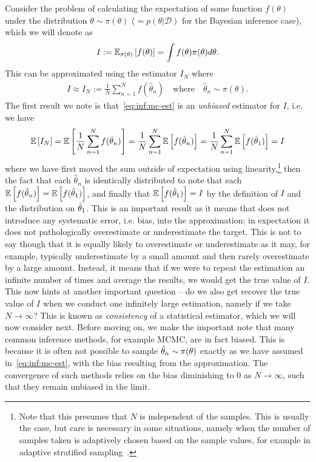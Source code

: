 Consider the problem of calculating the expectation of some function
$f(\theta)$ under the distribution $\theta\sim \pi(\theta)$ ($= p(\theta | \mathcal{D})$ for the Bayesian
inference case), which we will denote 
as
\begin{align}
	\label{eq:inf:expt}
I:=\mathbb{E}_{\pi(\theta)} \left[f(\theta)\right]=\int f(\theta) \pi(\theta) d\theta.
\end{align}
This can be approximated using the \mc estimator $I_N$ where
\begin{align}
	\label{eq:inf:mc-est}
	I \approx I_N := \frac{1}{N} \sum_{n=1}^{N}f(\hat{\theta}_n)
	\quad \text{where} \quad \hat{\theta}_n \sim \pi(\theta).
\end{align}
The first result we note is that~\eqref{eq:inf:mc-est} is an \emph{unbiased} estimator for $I$, i.e. we have
\begin{align}
\label{eq:inf:unbiased}
\mathbb{E} \left[I_N\right] = \mathbb{E} \left[\frac{1}{N} \sum_{n=1}^{N}f(\hat{\theta}_n)\right]
= \frac{1}{N} \sum_{n=1}^{N} \mathbb{E} \left[f(\hat{\theta}_n)\right]
= \frac{1}{N} \sum_{n=1}^{N} \mathbb{E} \left[f(\hat{\theta}_1)\right]
= I
\end{align}
where we have first moved the sum outside of expectation using
linearity,\footnote{Note that this presumes that $N$ is independent
	of the samples.  This is usually the case, but care is necessary in some situations, namely when
	the number of samples taken is adaptively chosen based on the sample values, for example in
	adaptive stratified sampling~\citep{etore2010adaptive}.}
then the fact that each $\hat{\theta}_n$ is identically distributed to note that
each $\mathbb{E} \left[f(\hat{\theta}_n)\right]= \mathbb{E} \left[f(\hat{\theta}_1)\right]$, and finally
that $\mathbb{E} \left[f(\hat{\theta}_1)\right] = I$ by the definition of $I$ and the distribution
on $\hat{\theta}_1$.  This is an important result as it means that \mc does not introduce
any systematic error, i.e. bias, into the approximation: in expectation it does not
pathologically overestimate or underestimate the target.  This is not to say though that it is
equally likely to overestimate or underestimate as it may, for example, typically underestimate
by a small amount and then rarely overestimate by a large amount.  Instead, it means that if we
were to repeat the estimation an infinite number of times and average the results, we would
get the true value of $I$.  This now hints at another important question -- do we also get
recover the true value of $I$ when we conduct one infinitely large estimation, namely if we
take $N\rightarrow\infty$?  This is known as \emph{consistency} of a statistical estimator,
which we will now consider next.  Before moving
on, we make the important note that many common \mc inference methods, for example MCMC, are in fact biased.  
This is because it is often not possible to sample $\hat{\theta}_n \sim \pi(\theta)$
exactly as we have assumed in~\eqref{eq:inf:mc-est}, with the bias resulting from
the approximation.  The convergence of such methods relies on the bias 
diminishing to $0$ as $N\rightarrow\infty$, such that they remain unbiased in the limit.

